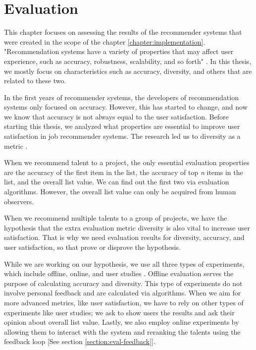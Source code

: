 
\chapter{Evaluation}\label{chapter:evaluation}

This chapter focuses on assessing the results of the recommender systems that were created in the scope of the chapter \ref{chapter:implementation}. "Recommendation systems have a variety of properties that may affect user experience, such as accuracy, robustness, scalability, and so forth" \cite{shani2011evaluating}. In this thesis, we mostly focus on characteristics such as accuracy, diversity, and others that are related to these two. 

In the first years of recommender systems, the developers of recommendation systems only focused on accuracy. However, this has started to change, and now we know that accuracy is not always equal to the user satisfaction. Before starting this thesis, we analyzed what properties are essential to improve user satisfaction in job recommender systems. The research led us to diversity as a metric \cite{castells2015novelty}.

When we recommend talent to a project, the only essential evaluation properties are the accuracy of the first item in the list, the accuracy of top \textit{n} items in the list, and the overall list value. We can find out the first two via evaluation algorithms. However, the overall list value can only be acquired from human observers. 

When we recommend multiple talents to a group of projects, we have the hypothesis that the extra evaluation metric diversity is also vital to increase user satisfaction. That is why we need evaluation results for diversity, accuracy, and user satisfaction, so that prove or disprove the hypothesis. 

While we are working on our hypothesis, we use all three types of experiments, which include offline, online, and user studies \cite{shani2011evaluating}. Offline evaluation serves the purpose of calculating accuracy and diversity. This type of experiments do not involve personal feedback and are calculated via algorithms. When we aim for more advanced metrics, like user satisfaction, we have to rely on other types of experiments like user studies; we ask to show users the results and ask their opinion about overall list value. Lastly, we also employ online experiments by allowing them to interact with the system and reranking the talents using the feedback loop [See section \ref{section:eval-feedback}]. 

